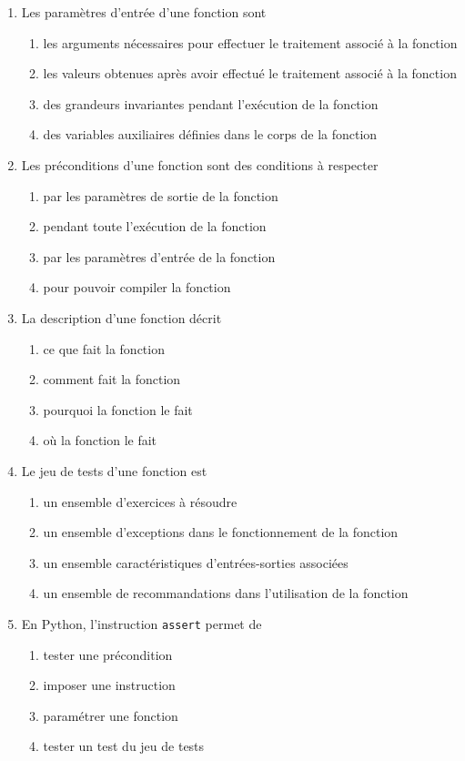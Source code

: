 \begin{td}[QCM (3)]
\begin{enumerate}
\item Les paramètres d'entrée d'une fonction sont
	\begin{enumerate}
	\item les arguments nécessaires pour effectuer le traitement associé à la fonction
	\item les valeurs obtenues après avoir effectué le traitement associé à la fonction
	\item des grandeurs invariantes pendant l'exécution de la fonction
	\item des variables auxiliaires définies dans le corps de la fonction
	\end{enumerate}
	
\item Les préconditions d'une fonction sont des conditions à respecter 
	\begin{enumerate}
	\item par les paramètres de sortie de la fonction
	\item pendant toute l'exécution de la fonction
	\item par les paramètres d'entrée de la fonction
	\item pour pouvoir compiler la fonction
	\end{enumerate}
	
\item La description d'une fonction décrit
	\begin{enumerate}
	\item ce que fait la fonction
	\item comment fait la fonction
	\item pourquoi la fonction le fait 
	\item où la fonction le fait
	\end{enumerate}
	
\item Le jeu de tests d'une fonction est 
	\begin{enumerate}
	\item un ensemble d'exercices à résoudre
	\item un ensemble d'exceptions dans le fonctionnement de la fonction
	\item un ensemble caractéristiques d'entrées-sorties associées
	\item un ensemble de recommandations dans l'utilisation de la fonction
	\end{enumerate}

\item En {\sc Python}, l'instruction {\tt assert} permet de 
	\begin{enumerate}
	\item tester une précondition
	\item imposer une instruction
	\item paramétrer une fonction
	\item tester un test du jeu de tests
	\end{enumerate}


\end{enumerate}
\end{td}

